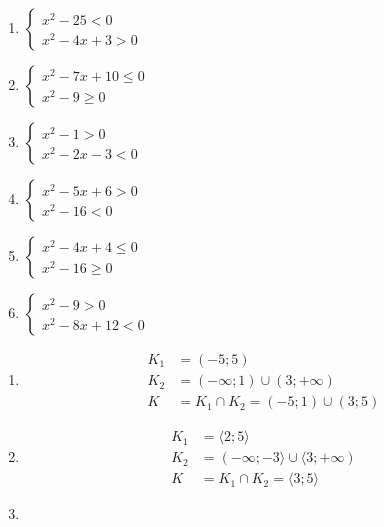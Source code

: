 \documentclass[11pt,a4paper]{article}
\begin{document}
\begin{zadaniReseniBox}[title={Domácí úkol}]
\begin{enumerate}[label=\alph*),itemsep=2pt]
\item $\begin{cases}x^{2} - 25<0\\x^{2} - 4x + 3>0\end{cases}$
\item $\begin{cases}x^{2} - 7x + 10\le0\\x^{2} - 9\ge0\end{cases}$
\item $\begin{cases}x^{2} - 1>0\\x^{2} - 2x - 3<0\end{cases}$
\item $\begin{cases}x^{2} - 5x + 6>0\\x^{2} - 16<0\end{cases}$
\item $\begin{cases}x^{2} - 4x + 4\le0\\x^{2} - 16\ge0\end{cases}$
\item $\begin{cases}x^{2} - 9>0\\x^{2} - 8x + 12<0\end{cases}$
\end{enumerate}
\tcblower
\begin{enumerate}[label=\alph*),itemsep=2pt]
\item
\[\begin{aligned}
K_1&=(-5;5)\\[2pt]
K_2&=(-\infty;1)\cup(3;+\infty)\\[2pt]
K&=K_1\cap K_2=(-5;1)\cup(3;5)
\end{aligned}\]
\item
\[\begin{aligned}
K_1&=\langle2;5\rangle\\[2pt]
K_2&=(-\infty;-3\rangle\cup\langle3;+\infty)\\[2pt]
K&=K_1\cap K_2=\langle3;5\rangle
\end{aligned}\]
\item
\[\begin{aligned}

\end{aligned}\]
\end{enumerate}
\end{zadaniReseniBox}
\end{document}
